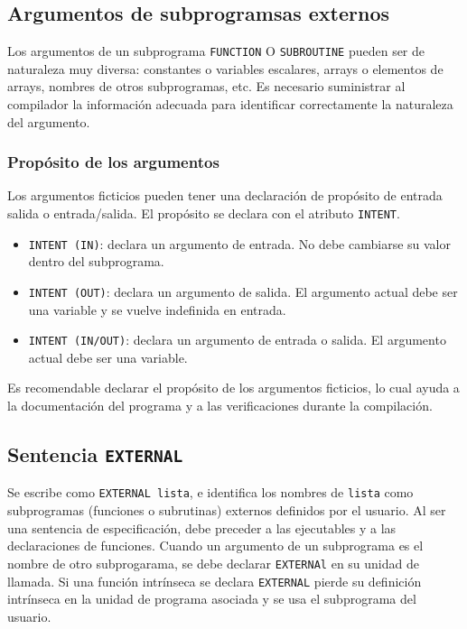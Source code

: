 \subsection{Argumentos de subprogramsas externos}

Los argumentos de un subprograma {\tt FUNCTION} O {\tt SUBROUTINE} pueden ser de naturaleza muy diversa: constantes o variables escalares, arrays o elementos de arrays, nombres de otros subprogramas, etc. Es necesario suministrar al compilador la información adecuada para identificar correctamente la naturaleza del argumento. 

\subsubsection{Propósito de los argumentos}

Los argumentos ficticios pueden tener una declaración de propósito de entrada salida o entrada/salida. El propósito se declara con el atributo {\tt INTENT}. 

\begin{itemize}
	\item {\tt INTENT (IN)}: declara un argumento de entrada. No debe cambiarse su valor dentro del subprograma. 
	\item {\tt INTENT (OUT)}: declara un argumento de salida. El argumento actual debe ser una variable y se vuelve indefinida en entrada.
	\item {\tt INTENT (IN/OUT)}: declara un argumento de entrada o salida. El argumento actual debe ser una variable.
\end{itemize}

Es recomendable declarar el propósito de los argumentos ficticios, lo cual ayuda a la documentación del programa y a las verificaciones durante la compilación.



\subsection{Sentencia {\tt EXTERNAL}}

Se escribe como {\tt EXTERNAL lista}, e identifica los nombres de {\tt lista} como subprogramas (funciones o subrutinas) externos definidos por el usuario. Al ser una sentencia de especificación, debe preceder a las  ejecutables y a las declaraciones de funciones. Cuando un argumento de un subprograma es el nombre de otro subprogarama, se debe declarar {\tt EXTERNAl} en su unidad de llamada. Si una función intrínseca se declara {\tt EXTERNAL} pierde su definición intrínseca en la unidad de programa asociada y se usa el subprograma del usuario. 


